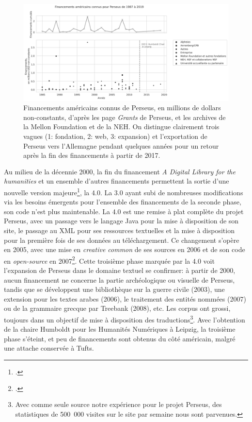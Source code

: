 \begin{figure}
    \centering
    \includegraphics[width=\linewidth]{figures/chap1/part1/PerseusFinancements.png}
    \caption{Financements américains connus de Perseus, en millions de dollars non-constants, d'après les page \textit{Grants} de Perseus, et les archives de la Mellon Foundation et de la NEH. On distingue clairement trois vagues (1: fondation, 2: web, 3: expansion) et l'exportation de Perseus vers l'Allemagne pendant quelques années pour un retour après la fin des financements à partir de 2017.}
    \label{fig:chap1:perseus_fundings}
\end{figure}

Au milieu de la décennie 2000, la fin du financement \textit{A Digital Library for the humanities} et un ensemble d'autres financements permettent la sortie d'une nouvelle version majeure\footcite{noauthor_gregory_nodate}, la 4.0. La 3.0 ayant subi de nombreuses modifications via les besoins émergents pour l'ensemble des financements de la seconde phase, son code n'est plus maintenable. La 4.0 est une remise à plat complète du projet Perseus, avec un passage vers le langage Java pour la mise à disposition de son site, le passage au XML pour ses ressources textuelles et la mise à disposition pour la première fois de ses données au téléchargement. Ce changement s'opère en 2005, avec une mise en \textit{creative common} de ses sources en 2006 et de son code en \textit{open-source} en 2007\footcite{rockwell_face_2013}. Cette troisième phase marquée par la 4.0 voit l'expansion de Perseus dans le domaine textuel se confirmer: à partir de 2000, aucun financement ne concerne la partie archéologique ou visuelle de Perseus, tandis que se développent une bibliothèque sur la guerre civile (2003), une extension pour les textes arabes (2006), le traitement des entités nommées (2007) ou de la grammaire grecque par Treebank (2008), etc. Les corpus ont grossi, toujours dans un objectif de mise à disposition des traductions\footnote{Avec comme seule source notre expérience pour le projet Perseus, des statistiques de 500~000 visites sur le site par semaine nous sont parvenues.}. Avec l'obtention de la chaire Humboldt pour les Humanités Numériques à Leipzig, la troisième phase s'éteint, et peu de financements sont obtenus du côté américain, malgré une attache conservée à Tufts.


